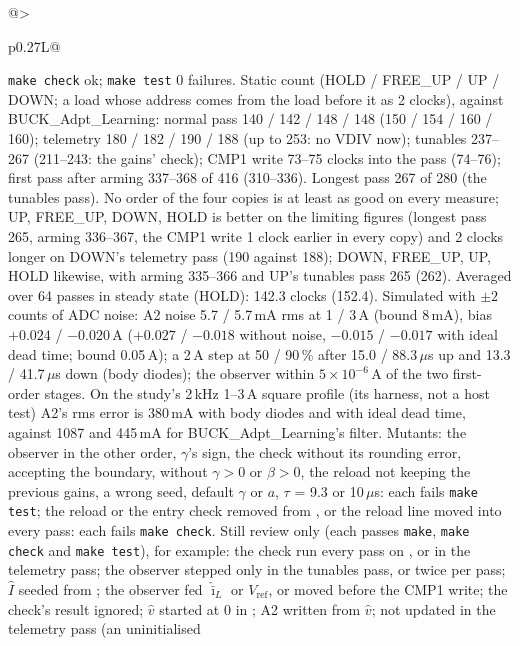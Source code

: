 \documentclass[11pt]{article}
\newcommand{\code}[1]{\texttt{\detokenize{#1}}}
\begin{document}
{\begin{xltabular}{\linewidth}{@{}>{\raggedright\arraybackslash}p{0.27\linewidth}L@{}}
    \texttt{make check} ok; \texttt{make test} 0 failures. Static count
    (HOLD / FREE\_UP / UP / DOWN; a load whose address comes from the load
    before it as 2 clocks), against BUCK\_Adpt\_Learning: normal pass 140 /
    142 / 148 / 148 (150 / 154 / 160 / 160); telemetry 180 / 182 / 190 /
    188 (up to 253: no VDIV now); tunables 237--267 (211--243: the gains'
    check); CMP1 write 73--75 clocks into the pass (74--76); first pass
    after arming 337--368 of 416 (310--336). Longest pass 267 of 280 (the
    tunables pass). No order of the four copies is at least as good on
    every measure; UP, FREE\_UP, DOWN, HOLD is better on the limiting
    figures (longest pass 265, arming 336--367, the CMP1 write 1 clock
    earlier in every copy) and 2 clocks longer on DOWN's telemetry pass
    (190 against 188); DOWN, FREE\_UP, UP, HOLD likewise, with arming
    335--366 and UP's tunables pass 265 (262). Averaged over 64 passes in steady state (HOLD): 142.3
    clocks (152.4). Simulated with $\pm2$ counts of ADC noise: A2 noise 5.7
    / 5.7\,mA rms at 1 / 3\,A (bound 8\,mA), bias $+0.024$ / $-0.020$\,A
    ($+0.027$ / $-0.018$ without noise, $-0.015$ / $-0.017$ with ideal dead
    time; bound 0.05\,A); a 2\,A step at 50 / 90\,\% after 15.0 / 88.3\,$\mu$s
    up and 13.3 / 41.7\,$\mu$s down (body diodes); the observer within
    $5\times10^{-6}$\,A of the two first-order stages. On the study's
    2\,kHz 1--3\,A square profile (its harness, not a host test) A2's rms
    error is 380\,mA with body diodes and with ideal dead time, against 1087
    and 445\,mA for BUCK\_Adpt\_Learning's filter. Mutants: the observer
    in the other order, $\gamma$'s sign, the check without its rounding
    error, accepting the boundary, without $\gamma > 0$ or $\beta > 0$, the
    reload not keeping the previous gains, a wrong seed, default $\gamma$ or
    $a$, $\tau$ = 9.3 or 10\,$\mu$s: each fails \texttt{make test}; the
    reload or the entry check removed from \code{buck.c}, or the reload
    line moved into every pass: each fails \texttt{make check}. Still
    review only (each passes \texttt{make}, \texttt{make check} and
    \texttt{make test}), for example: the check run every pass on
    \code{c->t}, or in the telemetry pass; the observer stepped only in the
    tunables pass, or twice per pass; $\hat I$ seeded from
    \code{out.i_avg}; the observer fed $\hat{\bar\imath}_L$ or $V_\mathrm{ref}$,
    or moved before the CMP1 write; the check's result ignored; $\hat v$
    started at 0 in \code{run_loop}; A2 written from $\hat v$;
    \code{out.i_load} not updated in the telemetry pass (an uninitialised

\end{xltabular}}
\end{document}
